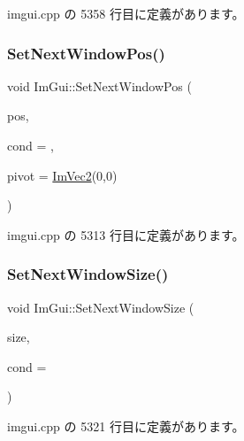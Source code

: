  imgui.\+cpp の 5358 行目に定義があります。

\mbox{\label{namespace_im_gui_afbccd31113430670b5ab2bf0d6f509bf}} 
\subsubsection{\texorpdfstring{Set\+Next\+Window\+Pos()}{SetNextWindowPos()}}
{\footnotesize\ttfamily void Im\+Gui\+::\+Set\+Next\+Window\+Pos (\begin{DoxyParamCaption}\item[{const \mbox{\hyperlink{struct_im_vec2}{Im\+Vec2}} \&}]{pos,  }\item[{\mbox{\hyperlink{imgui_8h_aef890d6ac872e12c5804d0b3e4f7f103}{Im\+Gui\+Cond}}}]{cond = {},  }\item[{const \mbox{\hyperlink{struct_im_vec2}{Im\+Vec2}} \&}]{pivot = {\ttfamily \mbox{\hyperlink{struct_im_vec2}{Im\+Vec2}}(0,0)} }\end{DoxyParamCaption})}



 imgui.\+cpp の 5313 行目に定義があります。

\mbox{\label{namespace_im_gui_ab33717bb71ef5e393ae18656fc6b229d}} 
\subsubsection{\texorpdfstring{Set\+Next\+Window\+Size()}{SetNextWindowSize()}}
{\footnotesize\ttfamily void Im\+Gui\+::\+Set\+Next\+Window\+Size (\begin{DoxyParamCaption}\item[{const \mbox{\hyperlink{struct_im_vec2}{Im\+Vec2}} \&}]{size,  }\item[{\mbox{\hyperlink{imgui_8h_aef890d6ac872e12c5804d0b3e4f7f103}{Im\+Gui\+Cond}}}]{cond = {} }\end{DoxyParamCaption})}



 imgui.\+cpp の 5321 行目に定義があります。

\mbox{\label{namespace_im_gui_a06f40aaf9cf2539c8dba43156a131e45}} 
